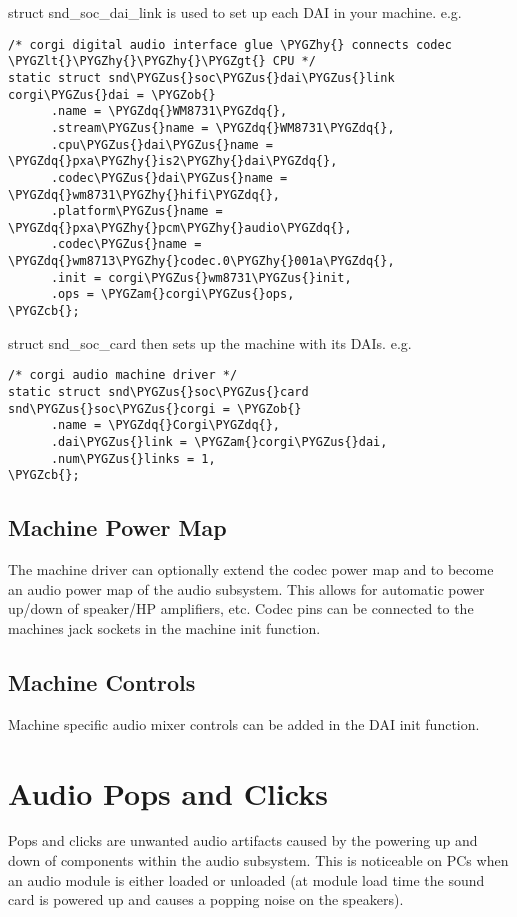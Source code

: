 \documentclass[a4paper,8pt,english]{sphinxmanual}
\def\PYGZus{\char`\_}
\def\PYGZob{\char`\{}
\def\PYGZcb{\char`\}}
\def\PYGZam{\char`\&}
\def\PYGZlt{\char`\<}
\def\PYGZgt{\char`\>}
\def\PYGZhy{\char`\-}
\def\PYGZdq{\char`\"}
\begin{document}
struct snd\_soc\_dai\_link is used to set up each DAI in your machine. e.g.

\begin{Verbatim}[commandchars=\\\{\}]
/* corgi digital audio interface glue \PYGZhy{} connects codec \PYGZlt{}\PYGZhy{}\PYGZhy{}\PYGZgt{} CPU */
static struct snd\PYGZus{}soc\PYGZus{}dai\PYGZus{}link corgi\PYGZus{}dai = \PYGZob{}
      .name = \PYGZdq{}WM8731\PYGZdq{},
      .stream\PYGZus{}name = \PYGZdq{}WM8731\PYGZdq{},
      .cpu\PYGZus{}dai\PYGZus{}name = \PYGZdq{}pxa\PYGZhy{}is2\PYGZhy{}dai\PYGZdq{},
      .codec\PYGZus{}dai\PYGZus{}name = \PYGZdq{}wm8731\PYGZhy{}hifi\PYGZdq{},
      .platform\PYGZus{}name = \PYGZdq{}pxa\PYGZhy{}pcm\PYGZhy{}audio\PYGZdq{},
      .codec\PYGZus{}name = \PYGZdq{}wm8713\PYGZhy{}codec.0\PYGZhy{}001a\PYGZdq{},
      .init = corgi\PYGZus{}wm8731\PYGZus{}init,
      .ops = \PYGZam{}corgi\PYGZus{}ops,
\PYGZcb{};
\end{Verbatim}

struct snd\_soc\_card then sets up the machine with its DAIs. e.g.

\begin{Verbatim}[commandchars=\\\{\}]
/* corgi audio machine driver */
static struct snd\PYGZus{}soc\PYGZus{}card snd\PYGZus{}soc\PYGZus{}corgi = \PYGZob{}
      .name = \PYGZdq{}Corgi\PYGZdq{},
      .dai\PYGZus{}link = \PYGZam{}corgi\PYGZus{}dai,
      .num\PYGZus{}links = 1,
\PYGZcb{};
\end{Verbatim}


\subsection{Machine Power Map}
\label{sound/soc/machine:machine-power-map}
The machine driver can optionally extend the codec power map and to become an
audio power map of the audio subsystem. This allows for automatic power up/down
of speaker/HP amplifiers, etc. Codec pins can be connected to the machines jack
sockets in the machine init function.


\subsection{Machine Controls}
\label{sound/soc/machine:machine-controls}
Machine specific audio mixer controls can be added in the DAI init function.


\section{Audio Pops and Clicks}
\label{sound/soc/pops-clicks::doc}\label{sound/soc/pops-clicks:audio-pops-and-clicks}
Pops and clicks are unwanted audio artifacts caused by the powering up and down
of components within the audio subsystem. This is noticeable on PCs when an
audio module is either loaded or unloaded (at module load time the sound card is
powered up and causes a popping noise on the speakers).
\end{document}

